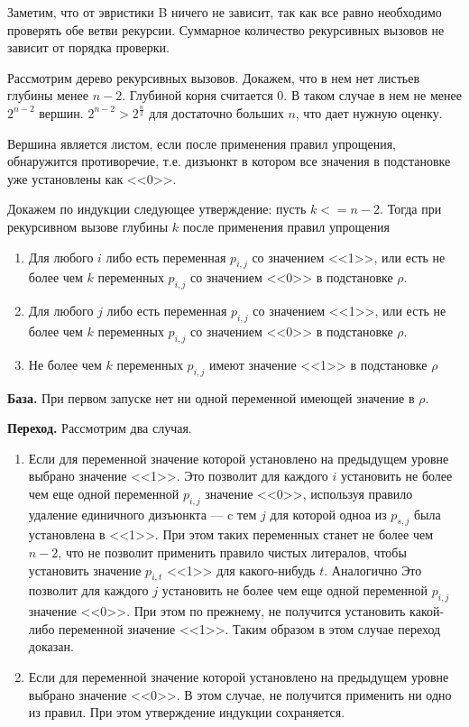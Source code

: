 \documentclass[10pt,a4paper]{article}
\begin{document}
\raggedbottom


Заметим, что от эвристики B ничего не зависит, так как все равно необходимо проверять обе ветви рекурсии.
Суммарное количество рекурсивных вызовов не зависит от порядка проверки.

Рассмотрим дерево рекурсивных вызовов.
Докажем, что в нем нет листьев глубины менее $n-2$. Глубиной корня считается 0. В таком случае в 
нем не менее $2^{n-2}$ вершин. $2^{n-2} > 2^{\frac{n}{2}}$ для достаточно больших $n$,
что дает нужную оценку.

Вершина является листом, если после применения правил упрощения,
обнаружится противоречие, т.е. дизъюнкт в котором все значения в подстановке
уже установлены как <<0>>.

Докажем по индукции следующее утверждение:
пусть $k <= n-2$. Тогда при рекурсивном вызове глубины $k$ после применения правил упрощения
\begin{enumerate}
\item Для любого $i$ либо есть переменная $p_{i,j}$ со значением <<1>>, или есть не более чем $k$ переменных $p_{i,j}$ со значением <<0>> в подстановке $\rho$.
\item Для любого $j$ либо есть переменная $p_{i,j}$ со значением <<1>>, или есть не более чем $k$ переменных $p_{i,j}$ со значением <<0>> в подстановке $\rho$.
\item Не более чем $k$ переменных $p_{i,j}$ имеют значение <<1>> в подстановке $\rho$
\end{enumerate}

{\bf База.} При первом запуске нет ни одной переменной имеющей значение в $\rho$.

{\bf Переход.} Рассмотрим два случая. 
\begin{enumerate}
\item Если для переменной значение которой установлено на предыдущем уровне выбрано значение <<1>>.
	Это позволит для каждого $i$ установить не более чем еще одной переменной $p_{i,j}$ значение <<0>>, используя
	правило удаление единичного дизъюнкта --- c тем $j$ для которой одноа из $p_{s,j}$ была установлена в <<1>>.
	При этом таких переменных станет не более чем $n-2$, что не позволит применить правило чистых литералов,
	чтобы установить значение $p_{i,t}$ <<1>> для какого-нибудь $t$.
	Аналогично Это позволит для каждого $j$ установить не более чем еще одной переменной $p_{i,j}$ значение <<0>>.
	При этом по прежнему, не получится установить какой-либо переменной значение <<1>>.
	Таким образом в этом случае переход доказан.
\item Если для переменной значение которой установлено на предыдущем уровне выбрано значение <<0>>.
	В этом случае, не получится применить ни одно из правил. При этом утверждение индукции сохраняется.
\end{enumerate}
\end{document}
